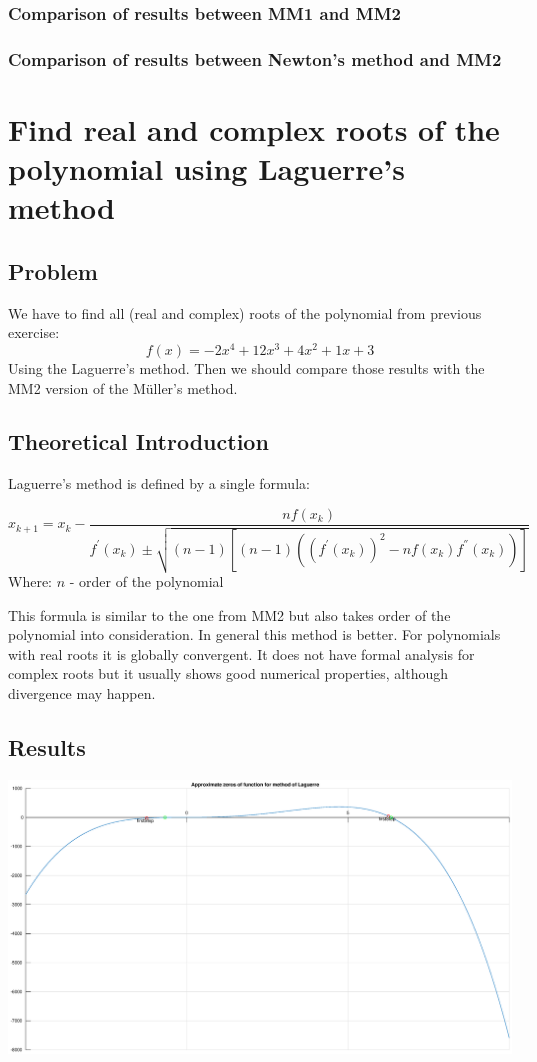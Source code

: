 \documentclass[12pt]{report}
\begin{document}
\subsection{Comparison of results between MM1 and MM2}
\subsection{Comparison of results between Newton's method and MM2}

\chapter{Find real and complex roots of the polynomial using Laguerre's method}

\section{Problem}
We have to find all (real and complex) roots of the polynomial from previous exercise:
\[ f(x) = -2x^4+12x^3+4x^2+1x+3 \]
Using the Laguerre's method. Then we should compare those results with the MM2 version of the  M{\"u}ller's method.


\section{Theoretical Introduction}
Laguerre's method is defined by a single formula:

\[ x_{k+1} = x_k - \frac{nf(x_k)}{f^{'}(x_k) \pm \sqrt{(n-1)[(n-1)( (f^{'}(x_k))^2 - nf(x_k)f^{''}(x_k) )]}} \]
Where:
$n$ - order of the polynomial

This formula is similar to the one from MM2 but also takes order of the polynomial into consideration. In general this method is better. For polynomials with real roots it is globally convergent. It does not have formal analysis for complex roots but it usually shows good numerical properties, although divergence may happen.

\section{Results}

\begin{center}
   \includegraphics[scale=0.25]{task3overall.eps}
\end{center}
\end{document}

